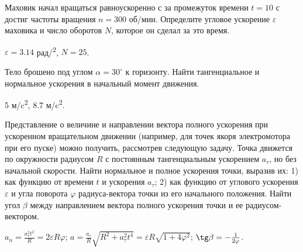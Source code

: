 \begin{ex} %
Маховик начал вращаться равноускоренно с за промежуток времени $t=10$ с достиг частоты вращения $n=300$ об/мин. Определите угловое ускорение $\varepsilon$ маховика и число оборотов $N$, которое он сделал за это время.
\begin{ans}
$\varepsilon =  3.14$ рад/\textsuperscript{2}, $N = 25$.
\end{ans}
\end{ex}

\begin{ex} %
Тело брошено под углом $\alpha = 30^{\circ}$ к горизонту. Найти тангенциальное и нормальное ускорения в начальный момент движения.
\begin{ans}
5 м/c\textsuperscript{2}, 8.7 м/c\textsuperscript{2}.
\end{ans}
\end{ex}

\begin{ex} %
Представление о величине и направлении вектора полного ускорения при ускоренном вращательном движении (например, для точек якоря электромотора при его пуске) можно получить, рассмотрев следующую задачу. Точка движется по окружности радиусом $R$ с постоянным тангенциальным ускорением $a_{\tau}$, но без начальной скорости. Найти нормальное и полное ускорения точки, выразив их: 1) как функцию от времени $t$ и ускорения $a_{\tau}$; 2) как функцию от углового ускорения $\varepsilon$ и угла поворота $\varphi$ радиуса-вектора точки из его начального положения. Найти угол $\beta$ между направлением вектора полного ускорения точки и ее
радиусом-вектором.
\begin{ans}
$a_n = \frac{a_{\tau}^2 t^2}{R} = 2 \varepsilon R \varphi$; $a = \frac{a_{\tau}}{R} \sqrt{R^2 + a_{\tau}^2 t^4} = \varepsilon R \sqrt{1 + 4 \varphi^2}$; $\tg \beta = -\frac{1}{2\varphi}$.
\end{ans}
\end{ex}

\complexProblems

